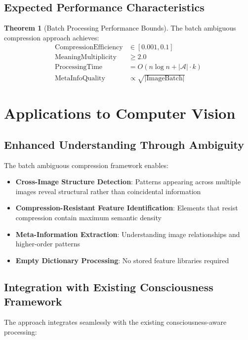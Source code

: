 \documentclass[12pt,a4paper]{article}
\theoremstyle{definition}
\newtheorem{theorem}{Theorem}
\begin{document}
\subsection{Expected Performance Characteristics}

\begin{theorem}[Batch Processing Performance Bounds]
The batch ambiguous compression approach achieves:
\begin{align}
\text{CompressionEfficiency} &\in [0.001, 0.1] \\
\text{MeaningMultiplicity} &\geq 2.0 \\
\text{ProcessingTime} &= O(n \log n + |\mathcal{A}| \cdot k) \\
\text{MetaInfoQuality} &\propto \sqrt{|\text{ImageBatch}|}
\end{align}
\end{theorem}

\section{Applications to Computer Vision}

\subsection{Enhanced Understanding Through Ambiguity}

The batch ambiguous compression framework enables:

\begin{itemize}
\item \textbf{Cross-Image Structure Detection}: Patterns appearing across multiple images reveal structural rather than coincidental information
\item \textbf{Compression-Resistant Feature Identification}: Elements that resist compression contain maximum semantic density  
\item \textbf{Meta-Information Extraction}: Understanding image relationships and higher-order patterns
\item \textbf{Empty Dictionary Processing}: No stored feature libraries required
\end{itemize}

\subsection{Integration with Existing Consciousness Framework}

The approach integrates seamlessly with the existing consciousness-aware processing:
\end{document}
